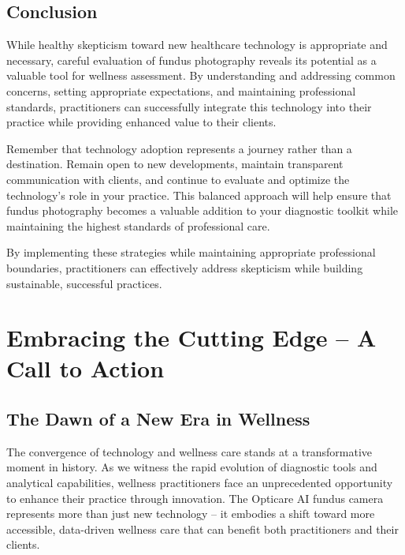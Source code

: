 \documentclass[
  Letterpaper,
]{scrbook}
\begin{document}
\section{Conclusion}\label{conclusion-5}

While healthy skepticism toward new healthcare technology is appropriate
and necessary, careful evaluation of fundus photography reveals its
potential as a valuable tool for wellness assessment. By understanding
and addressing common concerns, setting appropriate expectations, and
maintaining professional standards, practitioners can successfully
integrate this technology into their practice while providing enhanced
value to their clients.

Remember that technology adoption represents a journey rather than a
destination. Remain open to new developments, maintain transparent
communication with clients, and continue to evaluate and optimize the
technology's role in your practice. This balanced approach will help
ensure that fundus photography becomes a valuable addition to your
diagnostic toolkit while maintaining the highest standards of
professional care.

By implementing these strategies while maintaining appropriate
professional boundaries, practitioners can effectively address
skepticism while building sustainable, successful practices.


\chapter{Embracing the Cutting Edge -- A Call to
Action}\label{embracing-the-cutting-edge-a-call-to-action}

\section{The Dawn of a New Era in
Wellness}\label{the-dawn-of-a-new-era-in-wellness}

The convergence of technology and wellness care stands at a
transformative moment in history. As we witness the rapid evolution of
diagnostic tools and analytical capabilities, wellness practitioners
face an unprecedented opportunity to enhance their practice through
innovation. The Opticare AI fundus camera represents more than just new
technology -- it embodies a shift toward more accessible, data-driven
wellness care that can benefit both practitioners and their clients.
\end{document}
